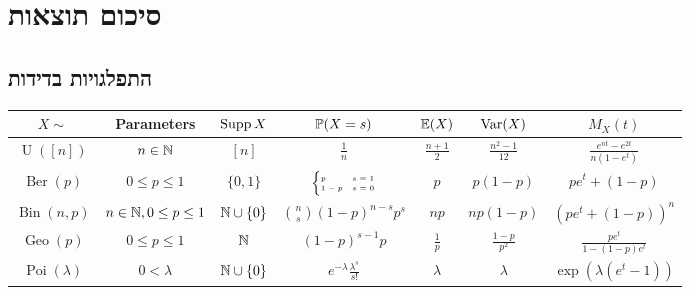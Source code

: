 \section{סיכום תוצאות}

\subsection{התפלגויות בדידות}
\begin{otherlanguage}{english}
	\begin{center}
		\begin{tabular}{c | c c c c c c} %
			$X \sim$ & Parameters & $\operatorname{Supp} X$ & $\mathbb{P}(X = s)$ & $\mathbb{E}(X)$ & $\operatorname{Var}(X)$ & $M_X(t)$ \\
			\hline %
			$\operatorname{U}([n])$ & $n \in \mathbb{N}$ & $[n]$ & $\frac{1}{n}$ & $\frac{n + 1}{2}$ & $\frac{n^2 - 1}{12}$ & $\frac{e^{nt} - e^{2t}}{n(1 - e^t)}$ \\
			\hline %
			$\operatorname{Ber}(p)$ & $0 \le p \le 1$ & $\{0, 1\}$ & $\tiny\begin{cases} p & s = 1 \\ 1 - p & s = 0 \end{cases}$ & $p$ & $p(1 - p)$ & $p e^t + (1 - p)$ \\
			\hline %
			$\operatorname{Bin}(n, p)$  & $n \in \mathbb{N}, 0 \le p \le 1$ & $\mathbb{N} \cup \{0\}$ & $\binom{n}{s} {(1 - p)}^{n - s} p^s$ & $np$ & $np(1 - p)$ & ${(pe^t + (1 - p))}^n$ \\
			\hline %
			$\operatorname{Geo}(p)$ & $0 \le p \le 1$ & $\mathbb{N}$ & ${(1 - p)}^{s - 1} p$ & $\frac{1}{p}$ & $\frac{1 - p}{p^2}$ & $\frac{p e^t}{1 - (1 - p) e^t}$ \\
			\hline %
			$\operatorname{Poi}(\lambda)$ & $0 < \lambda$ & $\mathbb{N} \cup \{0\}$ & $e^{-\lambda} \frac{\lambda^s}{s!}$ & $\lambda$ & $\lambda$ & $\exp(\lambda(e^t - 1))$ \\
		\end{tabular}
	\end{center}
\end{otherlanguage}

